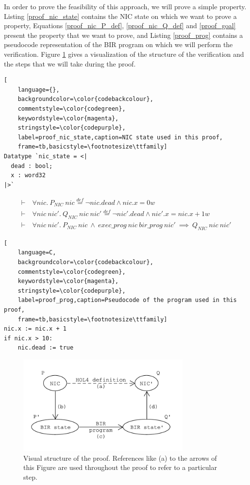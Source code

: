 \documentclass{kththesis}
\newcommand{\eqdef}{\stackrel{def}{=}}
\begin{document}
{%

In order to prove the feasibility of this approach, we will prove a simple property. Listing \ref{proof_nic_state} contains the NIC state on which we want to prove a property, Equations \ref{proof_nic_P_def}, \ref{proof_nic_Q_def} and \ref{proof_goal} present the property that we want to prove, and Listing \ref{proof_prog} contains a pseudocode representation of the BIR program on which we will perform the verification. Figure \ref{proof_schema} gives a visualization of the structure of the verification and the steps that we will take during the proof. 

\begin{lstlisting}[
    language={},
    backgroundcolor=\color{codebackcolour},
    commentstyle=\color{codegreen},
    keywordstyle=\color{magenta},
    stringstyle=\color{codepurple},
    label=proof_nic_state,caption=NIC state used in this proof,
    frame=tb,basicstyle=\footnotesize\ttfamily]
Datatype `nic_state = <|
  dead : bool;
  x : word32
|>`
\end{lstlisting}

\begin{small}
\begin{align}
\label{proof_nic_P_def}
\vdash~&\forall nic.~P_{NIC}~nic \eqdef \neg nic.dead \land nic.x = 0w\\
%
\label{proof_nic_Q_def}
\vdash~&\forall nic~nic'.~Q_{NIC}~nic~nic' \eqdef \neg nic'.dead \land nic'.x = nic.x + 1w\\
%
\label{proof_goal}
\vdash~&\forall nic~nic'.~P_{NIC}~nic~\land~exec\_prog~nic~bir\_prog~nic'~\implies~Q_{NIC}~nic~nic'
\end{align}
\end{small}

\begin{lstlisting}[
    language=C,
    backgroundcolor=\color{codebackcolour},
    commentstyle=\color{codegreen},
    keywordstyle=\color{magenta},
    stringstyle=\color{codepurple},
    label=proof_prog,caption=Pseudocode of the program used in this proof,
    frame=tb,basicstyle=\footnotesize\ttfamily]
nic.x := nic.x + 1
if nic.x > 10:
    nic.dead := true
\end{lstlisting}

\begin{figure}[!h]
	\includegraphics[height=5cm]{figures/proof_schema.png}
	\centering
	\caption{Visual structure of the proof. References like (a) to the arrows of this Figure are used throughout the proof to refer to a particular step.}
	\label{proof_schema}
\end{figure}

}
\end{document}
